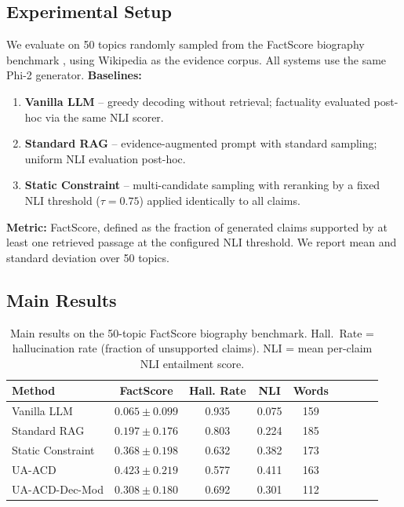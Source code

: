 \documentclass[11pt]{article}
\begin{document}
\subsection{Experimental Setup}
We evaluate on 50 topics randomly sampled from the FactScore biography benchmark \cite{min2023factscore}, using Wikipedia as the evidence corpus. All systems use the same Phi-2 generator.
\textbf{Baselines:}
\begin{enumerate}
  \item \textbf{Vanilla LLM} -- greedy decoding without retrieval;
        factuality evaluated post-hoc via the same NLI scorer.
  \item \textbf{Standard RAG} -- evidence-augmented prompt with
        standard sampling; uniform NLI evaluation post-hoc.
  \item \textbf{Static Constraint} -- multi-candidate sampling with
        reranking by a fixed NLI threshold ($\tau{=}0.75$) applied
        identically to all claims.
\end{enumerate}

\textbf{Metric:} FactScore, defined as the fraction of generated claims supported by at least one retrieved passage at the configured NLI threshold. We report mean and standard deviation over 50 topics.

\subsection{Main Results}

\begin{table}[t]
\centering
\small
\begin{tabular}{lcccccccc}
\toprule
Method & FactScore & Hall. Rate & NLI & Words \\
\midrule
Vanilla LLM       & $0.065 \pm 0.099$ & 0.935 & 0.075 & 159 \\
Standard RAG      & $0.197 \pm 0.176$ & 0.803 & 0.224 & 185 \\
Static Constraint & $0.368 \pm 0.198$ & 0.632 & 0.382 & 173 \\
UA-ACD            & $\mathbf{0.423 \pm 0.219}$ & 0.577 & 0.411 & 163 \\
UA-ACD-Dec-Mod    & $0.308 \pm 0.180$ & 0.692 & 0.301 & 112 \\
\bottomrule
\end{tabular}
\caption{Main results on the 50-topic FactScore biography benchmark. Hall.~Rate = hallucination rate (fraction of unsupported claims). NLI = mean per-claim NLI entailment score.}
\label{tab:main}
\end{table}
\end{document}
